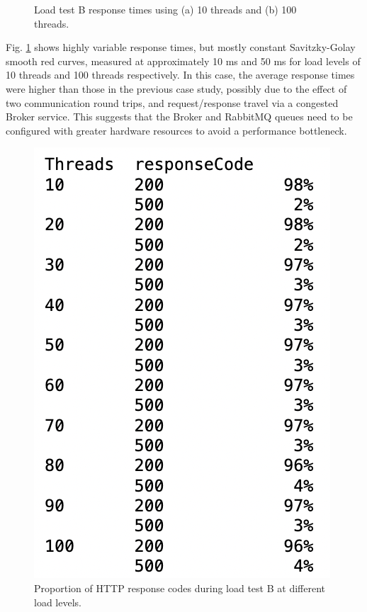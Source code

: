 \begin{figure}[H]
  \centering
  \caption{Load test B response times using (a) 10 threads and (b) 100 threads.}
  \label{fig:cs02-ltb-12}
\end{figure}

Fig. \ref{fig:cs02-ltb-12} shows highly variable response times, but mostly constant Savitzky-Golay smooth red curves, measured at approximately 10 ms and 50 ms for load levels of 10 threads and 100 threads respectively. In this case, the average response times were higher than those in the previous case study, possibly due to the effect of two communication round trips, and request/response travel via a congested Broker service. This suggests that the Broker and RabbitMQ queues need to be configured with greater hardware resources to avoid a performance bottleneck.

\begin{figure}[H]
  \centering
  \includegraphics[width=0.35\linewidth]{./assets/images/case-study-02/cs02-ltb-3.png}
  \caption{Proportion of HTTP response codes during load test B at different load levels.}
  \label{fig:cs02-ltb-3}
\end{figure}

